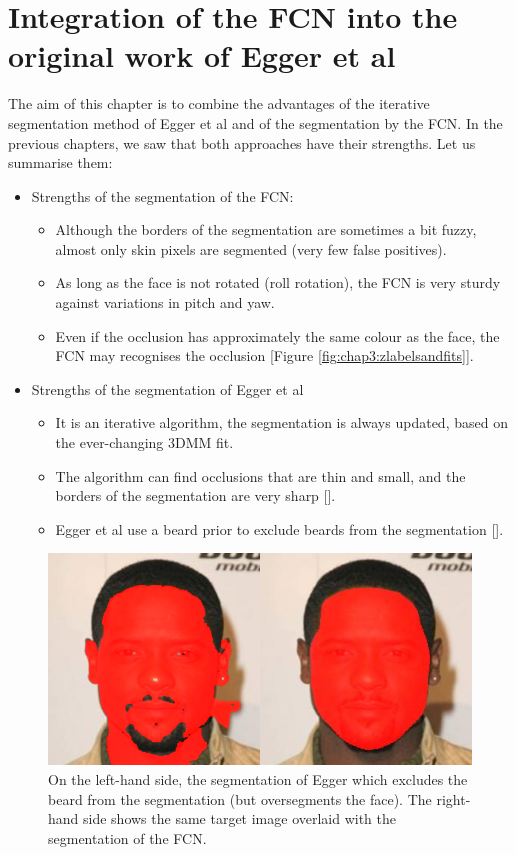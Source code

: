 \chapter{Integration of the FCN into the original work of Egger et al}

The aim of this chapter is to combine the advantages of the iterative segmentation method of Egger et al and of the segmentation by the FCN. In the previous chapters, we saw that both approaches have their strengths. Let us summarise them:

\begin{itemize}[nolistsep]
	\item Strengths of the segmentation of the FCN:
	\begin{itemize}[nolistsep]
		\item Although the borders of the segmentation are sometimes a bit fuzzy, almost only skin pixels are segmented (very few false positives).
		\item As long as the face is not rotated (roll rotation), the FCN is very sturdy against variations in pitch and yaw.
		\item Even if the occlusion has approximately the same colour as the face, the FCN may recognises the occlusion [Figure \ref{fig:chap3:zlabelsandfits}].
	\end{itemize}
	\item Strengths of the segmentation of Egger et al
	\begin{itemize}[nolistsep]
		\item It is an iterative algorithm, the segmentation is always updated, based on the ever-changing 3DMM fit.
		\item The algorithm can find occlusions that are thin and small, and the borders of the segmentation are very sharp [].
		\item Egger et al use a beard prior to exclude beards from the segmentation [].
	\end{itemize}
\end{itemize}

\begin{figure}[H]
	\centering
	\includegraphics[width=.33 \textwidth]{Figures/chap4/Beard_Prior_example.png}
	\caption{On the left-hand side, the segmentation of Egger which excludes the beard from the segmentation (but oversegments the face). The right-hand side shows the same target image overlaid with the segmentation of the FCN.}
	\label{fig:chap4:Beard_Prior_example}
\end{figure}

